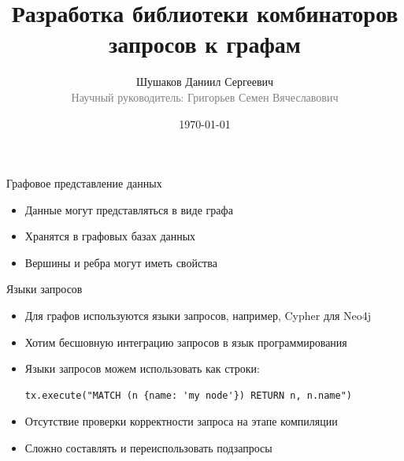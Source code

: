 \documentclass[aspectratio=169]{beamer}
\begin{document}
\title[Комбинаторы запросов к графам]
{
  Разработка библиотеки комбинаторов запросов к графам
}
\author[Шушаков Д.С.]
{
Шушаков Даниил Сергеевич\\
{\footnotesize\textcolor{gray}{Научный руководитель: Григорьев Семен Вячеславович}}\\
}
\date{\today}

\frame{\titlepage\thispagestyle{empty}}

\setlength{\parskip}{0.25cm}

\begin{frame}{Графовое представление данных}
  \begin{itemize}
    \item Данные могут представляться в виде графа
    \item Хранятся в графовых базах данных
    \item Вершины и ребра могут иметь свойства
  \end{itemize}

\end{frame}



\begin{frame}[fragile]{Языки запросов}
  \begin{itemize}
    \item Для графов используются языки запросов, например, Cypher для Neo4j
    \item Хотим бесшовную интеграцию запросов в язык программирования
    \item Языки запросов можем использовать как строки:
          \begin{verbatim}
tx.execute("MATCH (n {name: 'my node'}) RETURN n, n.name")
\end{verbatim}

    \item Отсутствие проверки корректности запроса на этапе компиляции
    \item Сложно составлять и переиспользовать подзапросы
  \end{itemize}

\end{frame}
\end{document}
